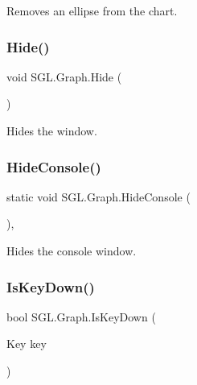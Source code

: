 Removes an ellipse from the chart. 

\mbox{\label{class_s_g_l_1_1_graph_ad01766cdde14e9f9bcae84caa9d5351d}} 
\subsubsection{\texorpdfstring{Hide()}{Hide()}}
{\footnotesize\ttfamily void S\+G\+L.\+Graph.\+Hide (\begin{DoxyParamCaption}{ }\end{DoxyParamCaption})\hspace{0.3cm}{\ttfamily [inline]}}



Hides the window. 

\mbox{\label{class_s_g_l_1_1_graph_ab88069c5a9c545be680996d876fad41f}} 
\subsubsection{\texorpdfstring{Hide\+Console()}{HideConsole()}}
{\footnotesize\ttfamily static void S\+G\+L.\+Graph.\+Hide\+Console (\begin{DoxyParamCaption}{ }\end{DoxyParamCaption})\hspace{0.3cm}{\ttfamily [inline]}, {\ttfamily [static]}}



Hides the console window. 

\mbox{\label{class_s_g_l_1_1_graph_aba994e0f4ec93be3f3d181fa128db070}} 
\subsubsection{\texorpdfstring{Is\+Key\+Down()}{IsKeyDown()}}
{\footnotesize\ttfamily bool S\+G\+L.\+Graph.\+Is\+Key\+Down (\begin{DoxyParamCaption}\item[{Key}]{key }\end{DoxyParamCaption})\hspace{0.3cm}{\ttfamily [inline]}}




